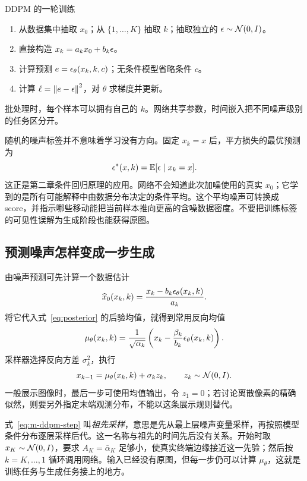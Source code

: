 \begin{examplebox}{DDPM 的一轮训练}
\begin{enumerate}[leftmargin=*,itemsep=2pt]
\item 从数据集中抽取 $x_0$；从 $\{1,\ldots,K\}$ 抽取 $k$；抽取独立的 $\epsilon\sim\mathcal{N}(0,I)$。
\item 直接构造 $x_k=a_kx_0+b_k\epsilon$。
\item 计算预测 $e=\epsilon_\theta(x_k,k,c)$；无条件模型省略条件 $c$。
\item 计算 $\ell=\left\lVert e-\epsilon\right\rVert^2$，对 $\theta$ 求梯度并更新。
\end{enumerate}
批处理时，每个样本可以拥有自己的 $k$。网络共享参数，时间嵌入把不同噪声级别的任务区分开。
\end{examplebox}

随机的噪声标签并不意味着学习没有方向。固定 $x_k=x$ 后，平方损失的最优预测为
\begin{equation}
\epsilon^*(x,k)=\mathbb{E}[\epsilon\mid x_k=x].
\label{eq:m-noise-conditional}
\end{equation}
这正是第二章条件回归原理的应用。网络不会知道此次加噪使用的真实 $x_0$；它学到的是所有可能解释中由数据分布决定的条件平均。这个平均噪声可转换成 score，并指示哪些移动能把当前样本推向更高的含噪数据密度。不要把训练标签的可见性误解为生成阶段也能获得原图。

\subsection{预测噪声怎样变成一步生成}

由噪声预测可先计算一个数据估计
\begin{equation}
\widehat x_0(x_k,k)=\frac{x_k-b_k\epsilon_\theta(x_k,k)}{a_k}.
\label{eq:m-x0-est}
\end{equation}
将它代入式~\eqref{eq:posterior} 的后验均值，就得到常用反向均值
\begin{equation}
\mu_\theta(x_k,k)=\frac{1}{\sqrt{\alpha_k}}
\left(x_k-\frac{\beta_k}{b_k}\epsilon_\theta(x_k,k)\right).
\label{eq:m-ddpm-mean}
\end{equation}
采样器选择反向方差 $\sigma_k^2$，执行
\begin{equation}
x_{k-1}=\mu_\theta(x_k,k)+\sigma_k z_k,\qquad
z_k\sim\mathcal{N}(0,I).
\label{eq:m-ddpm-step}
\end{equation}
一般展示图像时，最后一步可使用均值输出，令 $z_1=0$；若讨论离散像素的精确似然，则要另外指定末端观测分布，不能以这条展示规则替代。

式~\eqref{eq:m-ddpm-step} 叫\emph{祖先采样}，意思是先从最上层噪声变量采样，再按照模型条件分布逐层采样后代。这一名称与祖先的时间先后没有关系。开始时取 $x_K\sim\mathcal{N}(0,I)$，要求 $A_K=\bar\alpha_K$ 足够小，使真实终端边缘接近这一先验；然后按 $k=K,\ldots,1$ 循环调用网络。输入已经没有原图，但每一步仍可以计算 $\mu_\theta$，这就是训练任务与生成任务接上的地方。

